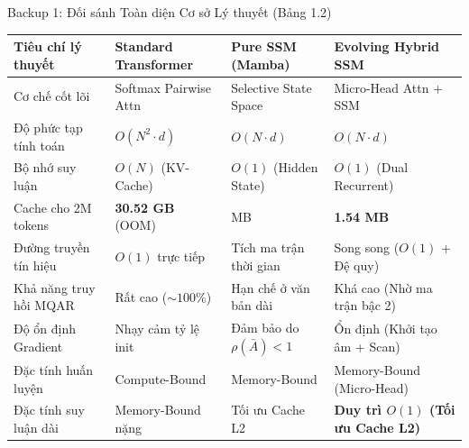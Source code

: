 \documentclass[aspectratio=169, 10pt]{beamer}
\begin{document}
\appendix

\begin{frame}{Backup 1: Đối sánh Toàn diện Cơ sở Lý thuyết (Bảng 1.2)}
  \centering
  \small
  \setlength{\tabcolsep}{3pt}
  \renewcommand{\arraystretch}{1.15}
  \begin{tabular}{>{\raggedright\arraybackslash}p{}>{\raggedright\arraybackslash}p{}>{\raggedright\arraybackslash}p{}>{\raggedright\arraybackslash}p{}}
    \hline
    \textbf{Tiêu chí lý thuyết} & \textbf{Standard Transformer} & \textbf{Pure SSM (Mamba)} & \textbf{Evolving Hybrid SSM} \\ \hline
    Cơ chế cốt lõi & Softmax Pairwise Attn & Selective State Space & Micro-Head Attn + SSM \\
    Độ phức tạp tính toán & $O(N^2 \cdot d)$ & $O(N \cdot d)$ & $O(N \cdot d)$ \\
    Bộ nhớ suy luận & $O(N)$ (KV-Cache) & $O(1)$ (Hidden State) & $O(1)$ (Dual Recurrent) \\
    Cache cho 2M tokens & \textbf{30.52 GB} (OOM) & 1.02 MB & \textbf{1.54 MB} \\
    Đường truyền tín hiệu & $O(1)$ trực tiếp & Tích ma trận thời gian & Song song ($O(1)$ + Đệ quy) \\
    Khả năng truy hồi MQAR & Rất cao ($\sim 100\%$) & Hạn chế ở văn bản dài & Khá cao (Nhờ ma trận bậc 2) \\
    Độ ổn định Gradient & Nhạy cảm tỷ lệ init & Đảm bảo do $\rho(\bar{A}) < 1$ & Ổn định (Khởi tạo âm + Scan) \\
    Đặc tính huấn luyện & Compute-Bound & Memory-Bound & Memory-Bound (Micro-Head) \\
    Đặc tính suy luận dài & Memory-Bound nặng & Tối ưu Cache L2 & \textbf{Duy trì $O(1)$ (Tối ưu Cache L2)} \\ \hline
  \end{tabular}
\end{frame}
\end{document}
